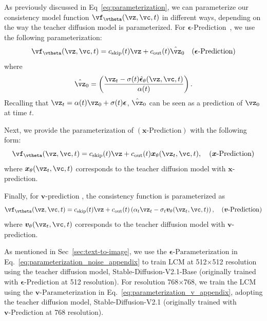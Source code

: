 \documentclass{article} %
\begin{document}
As previously discussed in Eq~\ref{eq:parameterization}, we can parameterize our consistency model function $ \vf_\vtheta(\vz, \vc, t)$ in different ways, depending on the way the teacher diffusion model is parameterized. 
For $\boldsymbol{\epsilon}\text{-Prediction}$~\citep{song2020denoising}, we 
use the following parameterization:
\begin{equation}
    \vf_\vtheta(\vz, \vc, t)=c_{\text{skip}}(t)\vz+c_{\text{out}}(t)
    \hat{\vz}_0
    \quad (\boldsymbol{\epsilon}\text{-Prediction})
    \label{eq:parameterization_noise_appendix}
\end{equation}
where 
\begin{equation}
    \hat{\vz}_0 = \left(\frac{\vz_t - \sigma(t) \hat{\boldsymbol{\epsilon}}_\theta(\vz, \vc,t)}{\alpha(t)}\right).
\end{equation}
Recalling that $\vz_t = \alpha(t) \vz_0 + \sigma(t) \boldsymbol{\epsilon}$,
$\hat{\vz}_0$ can be seen as a prediction of $\vz_0$ at time $t$.

Next, we provide the parameterization of $(\boldsymbol{x}\text{-Prediction})$ \citep{ho2020denoising, salimans2022progressive} with the following form:
\begin{equation}
    \vf_\vtheta(\vz, \vc, t)=c_{\text{skip}}(t)\vz+c_{\text{out}}(t) \boldsymbol{x}_\theta(\vz_t, \vc, t),\quad (\boldsymbol{x}\text{-Prediction})
    \label{eq:parameterization_x_appendix}
\end{equation}
where $\boldsymbol{x}_\theta(\vz_t, \vc, t)$ corresponds to the teacher diffusion model with $\boldsymbol{x}$-prediction.

Finally, for $\boldsymbol{v}$-prediction \citep{salimans2022progressive}, the consistency function is parameterized as
\begin{equation}
    \vf_\vtheta(\vz, \vc, t)=c_{\text{skip}}(t)\vz+c_{\text{out}}(t)\left(\alpha_t \vz_t - \sigma_t \boldsymbol{v}_\theta(\vz_t, \vc, t)\right),\quad (\boldsymbol{v}\text{-Prediction})
    \label{eq:parameterization_v_appendix}
\end{equation}
where $\boldsymbol{v}_\theta(\vz_t, \vc, t)$ corresponds to the teacher diffusion model with $\boldsymbol{v}$-prediction.

As mentioned in Sec~\ref{sec:text-to-image}, we use the $\boldsymbol{\epsilon}\text{-Parameterization}$ in Eq.~\ref{eq:parameterization_noise_appendix} to train LCM at 512$\times$512 resolution using the teacher diffusion model, Stable-Diffusion-V2.1-Base (originally trained with $\boldsymbol{\epsilon}\text{-Prediction}$ at 512 resolution). For resolution 768$\times$768, we train the LCM using the $\boldsymbol{v}\text{-Parameterization}$ in Eq.~\ref{eq:parameterization_v_appendix}, adopting the teacher diffusion model, Stable-Diffusion-V2.1 (originally trained with $\boldsymbol{v}\text{-Prediction}$ at 768 resolution). 
\end{document}
